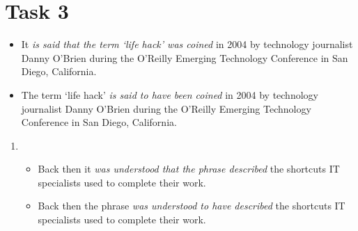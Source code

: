 \documentclass[a4paper]{article}
\begin{document}
\section{Task 3}
\begin{itemize}
    \item It \emph{is said that the term `life hack' was coined} in 2004 by technology journalist Danny O'Brien during the O'Reilly Emerging Technology Conference in San Diego, California.
    \item The term `life hack' \emph{is said to have been coined} in 2004 by technology journalist Danny O'Brien during the O'Reilly Emerging Technology Conference in San Diego, California.
\end{itemize}
\begin{enumerate}
    \item \begin{itemize}
        \item Back then it \emph{was understood that the phrase described} the shortcuts IT specialists used to complete their work.
        \item Back then the phrase \emph{was understood to have described} the shortcuts IT specialists used to complete their work.
    \end{itemize}
\end{enumerate}
\end{document}
